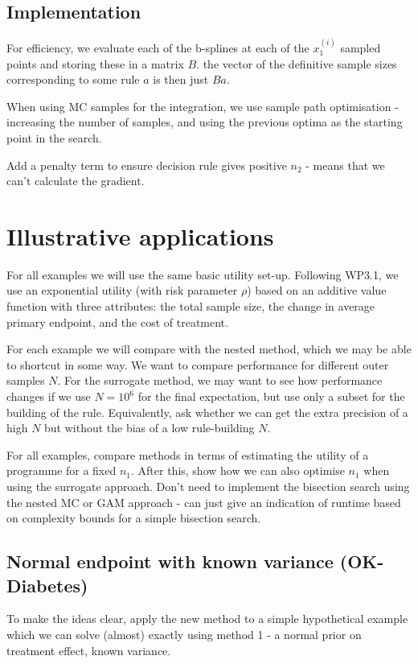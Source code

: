 \documentclass[sagev, Crown]{sagej} %
\begin{document}
\subsection{Implementation}

For efficiency, we evaluate each of the b-splines at each of the $x_1^{(i)}$ sampled points and storing these in a matrix $B$. the vector of the definitive sample sizes corresponding to some rule $a$ is then just $B a$.  

When using MC samples for the integration, we use sample path optimisation - increasing the number of samples, and using the previous optima as the starting point in the search.

Add a penalty term to ensure decision rule gives positive $n_2$ - means that we can't calculate the gradient.

\section{Illustrative applications}

For all examples we will use the same basic utility set-up. Following WP3.1, we use an exponential utility (with risk parameter $\rho$) based on an additive value function with three attributes: the total sample size, the change in average primary endpoint, and the cost of treatment.

For each example we will compare with the nested method, which we may be able to shortcut in some way. We want to compare performance for different outer samples $N$. For the surrogate method, we may want to see how performance changes if we use $N=10^6$ for the final expectation, but use only a subset for the building of the rule. Equivalently, ask whether we can get the extra precision of a high $N$ but without the bias of a low rule-building $N$.

For all examples, compare methods in terms of estimating the utility of a programme for a fixed $n_1$. After this, show how we can also optimise $n_1$ when using the surrogate approach. Don't need to implement the bisection search using the nested MC or GAM approach - can just give an indication of runtime based on complexity bounds for a simple bisection search.

\subsection{Normal endpoint with known variance (OK-Diabetes)}

To make the ideas clear, apply the new method to a simple hypothetical example which we can solve (almost) exactly using method 1 - a normal prior on treatment effect, known variance. 
\end{document}
